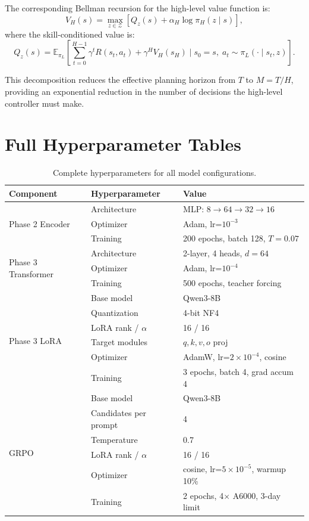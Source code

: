 \documentclass{article}
\begin{document}
The corresponding Bellman recursion for the high-level value function is:
\begin{equation}
V_H(s) = \max_{z \in \mathcal{Z}} \left[ Q_z(s) + \alpha_H \log \pi_H(z \mid s) \right],
\end{equation}
where the skill-conditioned value is:
\begin{equation}
Q_z(s) = \mathbb{E}_{\pi_L} \left[ \sum_{t=0}^{H-1} \gamma^t R(s_t, a_t) + \gamma^H V_H(s_H) \;\Big|\; s_0 = s,\; a_t \sim \pi_L(\cdot \mid s_t, z) \right].
\end{equation}

This decomposition reduces the effective planning horizon from $T$ to $M = T/H$, providing an exponential reduction in the number of decisions the high-level controller must make.

\section{Full Hyperparameter Tables}
\label{app:hyperparams}

\begin{table}[h]
\centering
\caption{Complete hyperparameters for all model configurations.}
\small
\begin{tabular}{lll}
\toprule
\textbf{Component} & \textbf{Hyperparameter} & \textbf{Value} \\
\midrule
\multirow{3}{*}{Phase 2 Encoder} & Architecture & MLP: $8 \to 64 \to 32 \to 16$ \\
& Optimizer & Adam, lr=$10^{-3}$ \\
& Training & 200 epochs, batch 128, $T=0.07$ \\
\midrule
\multirow{3}{*}{Phase 3 Transformer} & Architecture & 2-layer, 4 heads, $d=64$ \\
& Optimizer & Adam, lr=$10^{-4}$ \\
& Training & 500 epochs, teacher forcing \\
\midrule
\multirow{6}{*}{Phase 3 LoRA} & Base model & Qwen3-8B \\
& Quantization & 4-bit NF4 \\
& LoRA rank / $\alpha$ & 16 / 16 \\
& Target modules & $q,k,v,o$ proj \\
& Optimizer & AdamW, lr=$2\times10^{-4}$, cosine \\
& Training & 3 epochs, batch 4, grad accum 4 \\
\midrule
\multirow{6}{*}{GRPO} & Base model & Qwen3-8B \\
& Candidates per prompt & 4 \\
& Temperature & 0.7 \\
& LoRA rank / $\alpha$ & 16 / 16 \\
& Optimizer & cosine, lr=$5\times10^{-5}$, warmup 10\% \\
& Training & 2 epochs, 4$\times$ A6000, 3-day limit \\
\bottomrule
\end{tabular}
\end{table}
\end{document}
